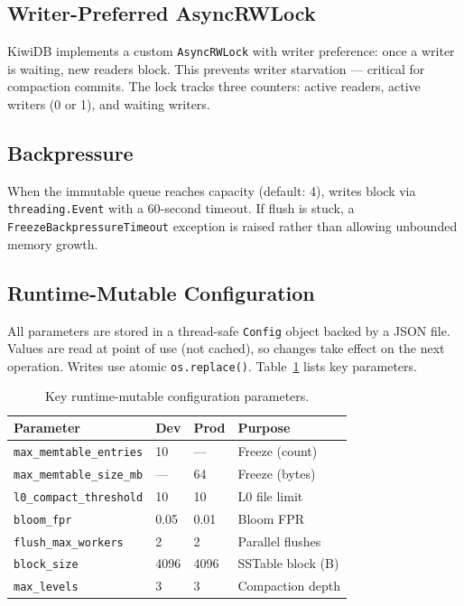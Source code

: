 \documentclass[conference]{IEEEtran}
\begin{document}
\subsection{Writer-Preferred AsyncRWLock}

KiwiDB implements a custom \texttt{AsyncRWLock} with writer preference: once a writer is waiting, new readers block. This prevents writer starvation --- critical for compaction commits. The lock tracks three counters: active readers, active writers (0 or 1), and waiting writers.

\subsection{Backpressure}

When the immutable queue reaches capacity (default: 4), writes block via \texttt{threading.Event} with a 60-second timeout. If flush is stuck, a \texttt{FreezeBackpressureTimeout} exception is raised rather than allowing unbounded memory growth.

\subsection{Runtime-Mutable Configuration}

All parameters are stored in a thread-safe \texttt{Config} object backed by a JSON file. Values are read at point of use (not cached), so changes take effect on the next operation. Writes use atomic \texttt{os.replace()}. Table~\ref{tab:config} lists key parameters.

\begin{table}[t]
\centering
\caption{Key runtime-mutable configuration parameters.}
\label{tab:config}
\begin{tabular}{@{}llll@{}}
\toprule
\textbf{Parameter} & \textbf{Dev} & \textbf{Prod} & \textbf{Purpose} \\
\midrule
\texttt{max\_memtable\_entries} & 10 & --- & Freeze (count) \\
\texttt{max\_memtable\_size\_mb} & --- & 64 & Freeze (bytes) \\
\texttt{l0\_compact\_threshold} & 10 & 10 & L0 file limit \\
\texttt{bloom\_fpr} & 0.05 & 0.01 & Bloom FPR \\
\texttt{flush\_max\_workers} & 2 & 2 & Parallel flushes \\
\texttt{block\_size} & 4096 & 4096 & SSTable block (B) \\
\texttt{max\_levels} & 3 & 3 & Compaction depth \\
\bottomrule
\end{tabular}
\end{table}
\end{document}
